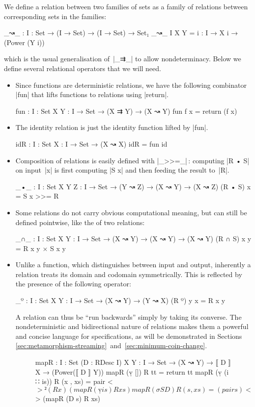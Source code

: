 We define a relation between two families of sets as a family of relations between corresponding sets in the families:
\begin{code}
_↝_ : {I : Set} → (I → Set) → (I → Set) → Set₁
_↝_ {I} X Y = {i : I} → X i → (Power (Y i))
\end{code}
which is the usual generalisation of~|_⇉_| to allow nondeterminacy.
Below we define several relational operators that we will need.
\begin{itemize}
\item Since functions are deterministic relations, we have the following combinator |fun| that lifts functions to relations using |return|.
\begin{code}
fun : {I : Set} {X Y : I → Set} → (X ⇉ Y) → (X ↝ Y)
fun f x = return (f x)
\end{code}
\item The identity relation is just the identity function lifted by |fun|.
\begin{code}
idR : {I : Set} {X : I → Set} → (X ↝ X)
idR = fun id
\end{code}
\item Composition of relations is easily defined with |_>>=_|\,: computing |R • S| on input~|x| is first computing |S x| and then feeding the result to~|R|.
\begin{code}
_•_ : {I : Set} {X Y Z : I → Set} → (Y ↝ Z) → (X ↝ Y) → (X ↝ Z)
(R • S) x = S x >>= R
\end{code}
\item Some relations do not carry obvious computational meaning, but can still be defined pointwise, like the  of two relations:
\begin{code}
_∩_ : {I : Set} {X Y : I → Set} → (X ↝ Y) → (X ↝ Y) → (X ↝ Y)
(R ∩ S) x y = R x y × S x y
\end{code}
\item Unlike a function, which distinguishes between input and output, inherently a relation treats its domain and codomain symmetrically.
This is reflected by the presence of the following  operator:
\begin{code}
_º : {I : Set} {X Y : I → Set} → (X ↝ Y) → (Y ↝ X)
(R º) y x = R x y
\end{code}
A relation can thus be ``run backwards'' simply by taking its converse.
The nondeterministic and bidirectional nature of relations makes them a powerful and concise language for specifications, as will be demonstrated in Sections \ref{sec:metamorphism-streaming}~and~\ref{sec:minimum-coin-change}.
\begin{figure}
\codefigure
\begin{code}
mapR :  {I : Set} (D : RDesc I) {X Y : I → Set} →
        (X ↝ Y) → ⟦ D ⟧ X → (Power(⟦ D ⟧ Y))
mapR (ṿ [])        R tt        =  return tt
mapR (ṿ (i ∷ is))  R (x , xs)  =  pair <$>² (R x) (mapR (ṿ is) R xs)
mapR (σ S D)       R (s , xs)  =  (pair s) <$> (mapR (D s) R xs)


\end{code}
\end{figure}
\end{itemize}
